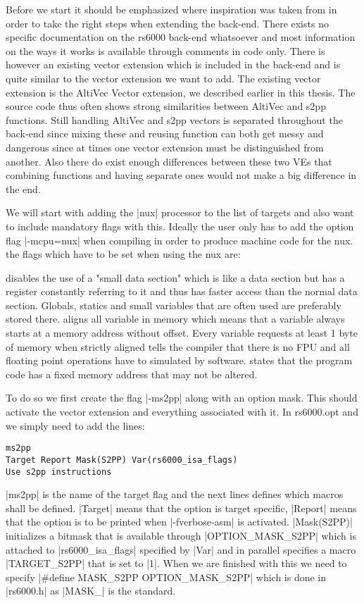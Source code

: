 Before we start it should be emphasized where inspiration was taken from in order to take the right steps when extending the back-end.
There exists no specific documentation on the rs6000 back-end whatsoever and most information on the ways it works is available through comments in code only.
There is however an existing vector extension which is included in the back-end and is quite similar to the vector extension we want to add.
The existing vector extension is the AltiVec Vector extension, we described earlier in this thesis.
The source code thus often shows strong similarities between AltiVec and s2pp functions.
Still handling AltiVec and s2pp vectors is separated throughout the back-end since mixing these and reusing function can both get messy and dangerous since at times one vector extension must be distinguished from another.
Also there do exist enough differences between these two VEs that combining functions and having separate ones would not make a big difference in the end.

We will start with adding the |nux| processor to the list of targets and also want to include mandatory flags with this.
Ideally the user only has to add the option flag |-mcpu=nux| when compiling in order to produce machine code for the nux.
the flags which have to be set when using the nux are:
\begin{description}
         disables the use of a "small data section" which is like a data section but has a register constantly referring to it and thus has faster access than the normal data section. Globals, statics and small variables that are often used are preferably stored there.
         aligns all variable in memory which means that a variable always starts at a memory address without offset. Every variable requests at least 1 byte of memory when strictly aligned
         tells the compiler that there is no FPU and all floating point operations have to simulated by software.
         states that the program code has a fixed memory address that may not be altered.
\end{description}

To do so we first create the flag |-ms2pp| along with an option mask.
This should activate the vector extension and everything associated with it.
In rs6000.opt and we simply need to add the lines:
\begin{lstlisting}
ms2pp
Target Report Mask(S2PP) Var(rs6000_isa_flags)
Use s2pp instructions
\end{lstlisting}
|ms2pp| is the name of the target flag and the next lines defines which macros shall be defined.
|Target| means that the option is target specific, |Report| means that the option is to be printed when |-fverbose-asm| is activated.
|Mask(S2PP)| initializes a bitmask that is available through |OPTION_MASK_S2PP| which is attached to |rs6000_isa_flags| specified by |Var| and in parallel specifies a macro |TARGET_S2PP| that is set to |1|. \cite{GCCint:options}
When we are finished with this we need to specify |#define MASK_S2PP OPTION_MASK_S2PP| which is done in |rs6000.h| as |MASK_| is the standard.

